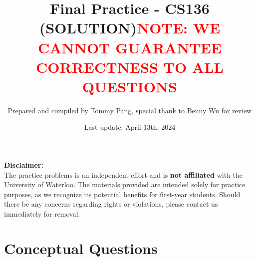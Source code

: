 \documentclass{article}
\begin{document}
\title{Final Practice - CS136 (SOLUTION)}
\author{Prepared and compiled by Tommy Pang, special thank to Benny Wu for review }
\date{Last update: April 13th, 2024}

\maketitle



\noindent
\textbf{Disclaimer:} \\
\vspace{3pt}
\noindent
The practice problems is an independent effort and is \textbf{not affiliated} with the University of Waterloo. The materials provided are intended solely for practice purposes, as we recognize its potential benefits for first-year students. Should there be any concerns regarding rights or violations, please contact us immediately for removal.

\vspace{20pt}
\title{\textbf{\textcolor{red}{NOTE: WE CANNOT GUARANTEE CORRECTNESS TO ALL QUESTIONS}}}


\vspace{10pt}

\section*{Conceptual Questions}
\end{document}
